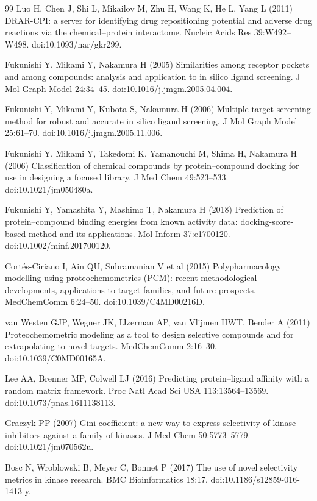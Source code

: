 \documentclass[11pt]{article}
\begin{document}
\begin{thebibliography}{99}
 Luo H, Chen J, Shi L, Mikailov M, Zhu H, Wang K, He L, Yang L
(2011) DRAR-CPI: a server for identifying drug repositioning potential and adverse drug
reactions via the chemical--protein interactome. Nucleic Acids Res 39:W492--W498.
doi:10.1093/nar/gkr299.

 Fukunishi Y, Mikami Y, Nakamura H (2005) Similarities among
receptor pockets and among compounds: analysis and application to in silico ligand
screening. J Mol Graph Model 24:34--45. doi:10.1016/j.jmgm.2005.04.004.

 Fukunishi Y, Mikami Y, Kubota S, Nakamura H (2006) Multiple
target screening method for robust and accurate in silico ligand screening. J Mol Graph
Model 25:61--70. doi:10.1016/j.jmgm.2005.11.006.

 Fukunishi Y, Mikami Y, Takedomi K, Yamanouchi M, Shima H,
Nakamura H (2006) Classification of chemical compounds by protein--compound docking for use
in designing a focused library. J Med Chem 49:523--533. doi:10.1021/jm050480a.

 Fukunishi Y, Yamashita Y, Mashimo T, Nakamura H (2018)
Prediction of protein--compound binding energies from known activity data: docking-score-
based method and its applications. Mol Inform 37:e1700120.
doi:10.1002/minf.201700120.

 Cort\'es-Ciriano I, Ain QU, Subramanian V et al (2015)
Polypharmacology modelling using proteochemometrics (PCM): recent methodological
developments, applications to target families, and future prospects. MedChemComm 6:24--50.
doi:10.1039/C4MD00216D.

 van Westen GJP, Wegner JK, IJzerman AP, van Vlijmen HWT, Bender A
(2011) Proteochemometric modeling as a tool to design selective compounds and for
extrapolating to novel targets. MedChemComm 2:16--30. doi:10.1039/C0MD00165A.

 Lee AA, Brenner MP, Colwell LJ (2016) Predicting protein--ligand affinity
with a random matrix framework. Proc Natl Acad Sci USA 113:13564--13569.
doi:10.1073/pnas.1611138113.

 Graczyk PP (2007) Gini coefficient: a new way to express selectivity
of kinase inhibitors against a family of kinases. J Med Chem 50:5773--5779.
doi:10.1021/jm070562u.

 Bosc N, Wroblowski B, Meyer C, Bonnet P (2017) The use of novel
selectivity metrics in kinase research. BMC Bioinformatics 18:17.
doi:10.1186/s12859-016-1413-y.


\end{thebibliography}
\end{document}
